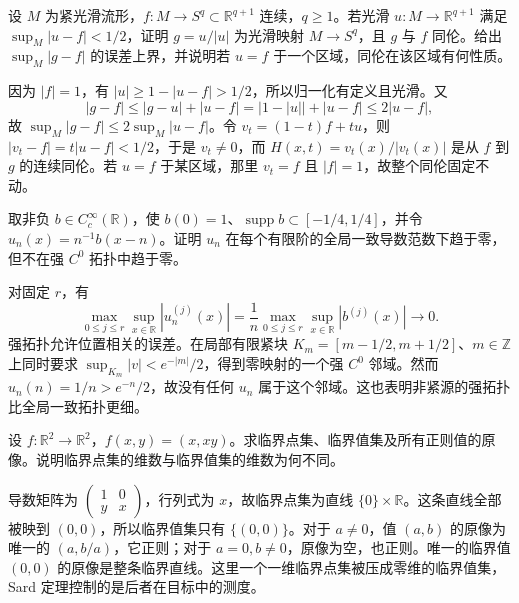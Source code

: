 \begin{exercise}\label{g2:ex:sphere-valued-approximation}
	设 \(M\) 为紧光滑流形，\(f:M\to S^q\subset\mathbb R^{q+1}\) 连续，\(q\ge1\)。若光滑 \(u:M\to\mathbb R^{q+1}\) 满足 \(\sup_M|u-f|<1/2\)，证明 \(g=u/|u|\) 为光滑映射 \(M\to S^q\)，且 \(g\) 与 \(f\) 同伦。给出 \(\sup_M|g-f|\) 的误差上界，并说明若 \(u=f\) 于一个区域，同伦在该区域有何性质。
\end{exercise}
\begin{solution}
	因为 \(|f|=1\)，有 \(|u|\ge1-|u-f|>1/2\)，所以归一化有定义且光滑。又
	\[
		|g-f|\le|g-u|+|u-f|=\bigl|1-|u|\bigr|+|u-f|\le2|u-f|,
	\]
	故 \(\sup_M|g-f|\le2\sup_M|u-f|\)。令 \(v_t=(1-t)f+tu\)，则 \(|v_t-f|=t|u-f|<1/2\)，于是 \(v_t\ne0\)，而 \(H(x,t)=v_t(x)/|v_t(x)|\) 是从 \(f\) 到 \(g\) 的连续同伦。若 \(u=f\) 于某区域，那里 \(v_t=f\) 且 \(|f|=1\)，故整个同伦固定不动。
\end{solution}

\begin{exercise}\label{g2:ex:uniform-not-strong-convergence}
	取非负 \(b\in C^\infty_c(\mathbb R)\)，使 \(b(0)=1\)、\(\operatorname{supp}b\subset[-1/4,1/4]\)，并令 \(u_n(x)=n^{-1}b(x-n)\)。证明 \(u_n\) 在每个有限阶的全局一致导数范数下趋于零，但不在强 \(C^0\) 拓扑中趋于零。
\end{exercise}
\begin{solution}
	对固定 \(r\)，有
	\[
		\max_{0\le j\le r}\sup_{x\in\mathbb R}|u_n^{(j)}(x)|
		=\frac1n\max_{0\le j\le r}\sup_{x\in\mathbb R}|b^{(j)}(x)|\longrightarrow0.
	\]
	强拓扑允许位置相关的误差。在局部有限紧块 \(K_m=[m-1/2,m+1/2]\)、\(m\in\mathbb Z\) 上同时要求 \(\sup_{K_m}|v|<e^{-|m|}/2\)，得到零映射的一个强 \(C^0\) 邻域。然而 \(u_n(n)=1/n>e^{-n}/2\)，故没有任何 \(u_n\) 属于这个邻域。这也表明非紧源的强拓扑比全局一致拓扑更细。
\end{solution}

\begin{exercise}\label{g2:ex:critical-collapse}
	设 \(f:\mathbb R^2\to\mathbb R^2\)，\(f(x,y)=(x,xy)\)。求临界点集、临界值集及所有正则值的原像。说明临界点集的维数与临界值集的维数为何不同。
\end{exercise}
\begin{solution}
	导数矩阵为 \(\begin{pmatrix}1&0\\y&x\end{pmatrix}\)，行列式为 \(x\)，故临界点集为直线 \(\{0\}\times\mathbb R\)。这条直线全部被映到 \((0,0)\)，所以临界值集只有 \(\{(0,0)\}\)。对于 \(a\ne0\)，值 \((a,b)\) 的原像为唯一的 \((a,b/a)\)，它正则；对于 \(a=0,b\ne0\)，原像为空，也正则。唯一的临界值 \((0,0)\) 的原像是整条临界直线。这里一个一维临界点集被压成零维的临界值集，Sard 定理控制的是后者在目标中的测度。
\end{solution}

